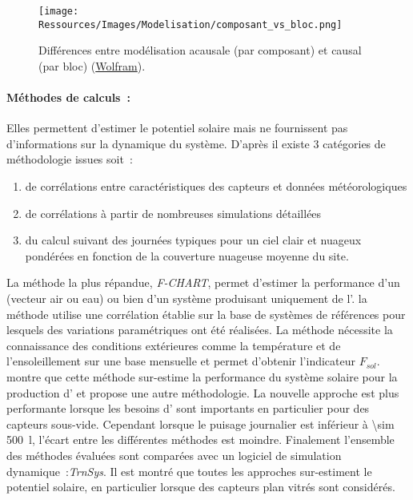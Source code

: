 \begin{figure}
    \centering
    \texttt{[image: Ressources/Images/Modelisation/composant\_vs\_bloc.png]}
    \caption[Différences entre modélisation acausale et causal]
            {Différences entre modélisation acausale (par composant) et causal (par bloc)
             (\href{http://www.wolfram.com/system-modeler/}{Wolfram}).}
    \label{fig:acausal_vs_causal}
\end{figure}

\paragraph{Méthodes de calculs~:} %
\label{par:methodes_de_calculs}
Elles permettent d’estimer le potentiel solaire mais ne fournissent pas d’informations sur
la dynamique du système. D’après \textcite{Duffie1980} il existe $3$ catégories de
méthodologie issues soit~:
\begin{enumerate}
    \item de corrélations entre caractéristiques des capteurs et
          données météorologiques
    \item de corrélations à partir de nombreuses simulations détaillées
    \item du calcul suivant des journées typiques pour un ciel clair et nuageux
          pondérées en fonction de la couverture nuageuse moyenne du site.
\end{enumerate}
La méthode la plus répandue, \textit{F-CHART}, permet d’estimer la performance
d’un  (vecteur air ou eau) ou bien d’un système produisant uniquement de
l’. la méthode utilise une corrélation établie sur la base de systèmes de
références pour lesquels des variations paramétriques ont été réalisées. La méthode
nécessite la connaissance des conditions extérieures comme la température et de l’ensoleillement
sur une base mensuelle et permet d’obtenir l’indicateur $F_{sol}$. \textcite{Cuadros200796} montre que cette
méthode sur-estime la performance du système solaire pour la production d’ et
propose une autre méthodologie. La nouvelle approche est plus performante lorsque les
besoins d’ sont importants en particulier pour des capteurs sous-vide. Cependant
lorsque le puisage journalier est inférieur à \SI{\sim 500}{\litre}, l’écart entre les
différentes méthodes est moindre. Finalement l’ensemble des méthodes évaluées sont
comparées avec un logiciel de simulation dynamique~:\textit{TrnSys}. Il est montré que
toutes les approches sur-estiment le potentiel solaire, en particulier lorsque des
capteurs plan vitrés sont considérés.

